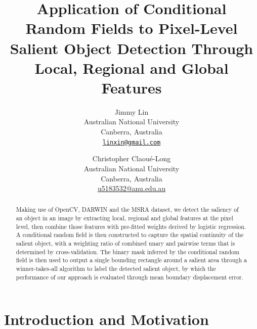 \documentclass[10pt,twocolumn,letterpaper]{article}
\begin{document}
\title{Application of Conditional Random Fields to Pixel-Level Salient Object Detection Through Local, Regional and Global Features}

\author{Jimmy Lin\\
Australian National University\\
Canberra, Australia\\
{\tt\small \url{linxin@gmail.com}}
\and
Christopher Claou\'e-Long\\
Australian National University\\
Canberra, Australia\\
{\small\url{u5183532@anu.edu.au}}
}

\maketitle

\begin{abstract}
Making use of OpenCV, DARWIN and the MSRA dataset, we detect the saliency of an object in an image by extracting local, regional and global features at the pixel level, then combine those features with pre-fitted weights derived by logistic regression. A conditional random field is then constructed to capture the spatial continuity of the salient object, with a weighting ratio of combined unary and pairwise terms that is determined by cross-validation. The binary mask inferred by the conditional random field is then used to output a single bounding rectangle around a salient area through a winner-takes-all algorithm to label the detected salient object, by which the performance of our approach is evaluated through mean boundary displacement error. 
\end{abstract}

\section{Introduction and Motivation}
\end{document}
